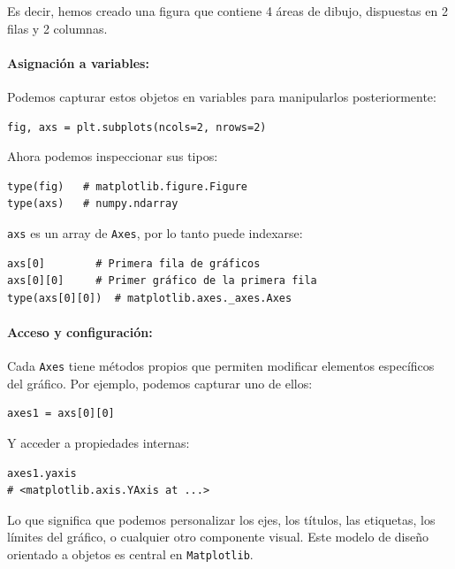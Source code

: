 \documentclass{article}
\theoremstyle{nonumberplain}
\begin{document}
Es decir, hemos creado una figura que contiene 4 áreas de dibujo, dispuestas en 2 filas y 2 columnas.

\paragraph{Asignación a variables:}

Podemos capturar estos objetos en variables para manipularlos posteriormente:

\begin{verbatim}
fig, axs = plt.subplots(ncols=2, nrows=2)
\end{verbatim}

Ahora podemos inspeccionar sus tipos:

\begin{verbatim}
type(fig)   # matplotlib.figure.Figure
type(axs)   # numpy.ndarray
\end{verbatim}

\texttt{axs} es un array de \texttt{Axes}, por lo tanto puede indexarse:

\begin{verbatim}
axs[0]        # Primera fila de gráficos
axs[0][0]     # Primer gráfico de la primera fila
type(axs[0][0])  # matplotlib.axes._axes.Axes
\end{verbatim}

\paragraph{Acceso y configuración:}

Cada \texttt{Axes} tiene métodos propios que permiten modificar elementos específicos del gráfico. Por ejemplo, podemos capturar uno de ellos:

\begin{verbatim}
axes1 = axs[0][0]
\end{verbatim}

Y acceder a propiedades internas:

\begin{verbatim}
axes1.yaxis
# <matplotlib.axis.YAxis at ...>
\end{verbatim}

Lo que significa que podemos personalizar los ejes, los títulos, las etiquetas, los límites del gráfico, o cualquier otro componente visual. Este modelo de diseño orientado a objetos es central en \texttt{Matplotlib}.

\vspace{0.5em}
\end{document}
